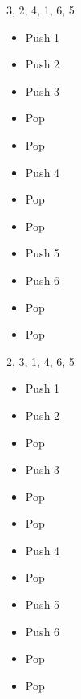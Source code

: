 \documentclass[11pt,a4paper]{article}
\begin{document}


\begin{center}
\begin{table}[ht!]
  \centering
  \begin{minipage}{0.33\textwidth}

\begin{center}
\begin{large}
3, 2, 4, 1, 6, 5
\end{large}

\medskip

\begin{itemize}
\item Push 1
\item Push 2
\item Push 3
\item Pop
\item Pop
\item Push 4
\item Pop
\item Pop
\item Push 5
\item Push 6
\item Pop
\item Pop
\end{itemize}

\end{center}

  \end{minipage}
  \hfillx
  \begin{minipage}{0.33\textwidth}

\begin{center}
\begin{large}
2, 3, 1, 4, 6, 5
\end{large}

\medskip

\begin{itemize}
\item Push 1
\item Push 2
\item Pop
\item Push 3
\item Pop
\item Pop
\item Push 4
\item Pop
\item Push 5
\item Push 6
\item Pop
\item Pop
\end{itemize}


\end{center}
\end{minipage}
\end{table}
\end{center}
\end{document}
